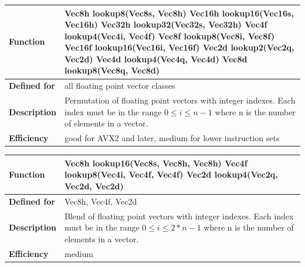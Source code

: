 \documentclass[vcl_manual.tex]{subfiles}
\begin{document}
\begin{tabular}{|p{30mm}|p{120mm}|}
\hline
\bfseries Function & 
Vec8h lookup8(Vec8s, Vec8h) \newline
Vec16h lookup16(Vec16s, Vec16h) \newline
Vec32h lookup32(Vec32s, Vec32h) \newline
Vec4f lookup4(Vec4i, Vec4f) \newline
Vec8f lookup8(Vec8i, Vec8f) \newline
Vec16f lookup16(Vec16i, Vec16f) \newline
Vec2d lookup2(Vec2q, Vec2d) \newline
Vec4d lookup4(Vec4q, Vec4d) \newline
Vec8d lookup8(Vec8q, Vec8d) \\ \hline
\bfseries Defined for & all floating point vector classes \\ \hline
\bfseries Description & Permutation of floating point vectors with integer indexes. Each index must be in the range  $0 \leq i \leq n-1$ where n is the number of elements in a vector. \\ \hline
\bfseries Efficiency & good for AVX2 and later, medium for lower instruction sets \\ \hline
\end{tabular}


\begin{tabular}{|p{30mm}|p{120mm}|}
\hline
\bfseries Function & 
Vec8h lookup16(Vec8s, Vec8h, Vec8h) \newline
Vec4f lookup8(Vec4i, Vec4f, Vec4f) \newline
Vec2d lookup4(Vec2q, Vec2d, Vec2d) \\ \hline
\bfseries Defined for & Vec8h, Vec4f, Vec2d \\ \hline
\bfseries Description & Blend of floating point vectors with integer indexes. Each index must be in the range  $0 \leq i \leq 2*n-1$ where n is the number of elements in a vector. \\ \hline
\bfseries Efficiency & medium \\ \hline
\end{tabular}
\end{document}
